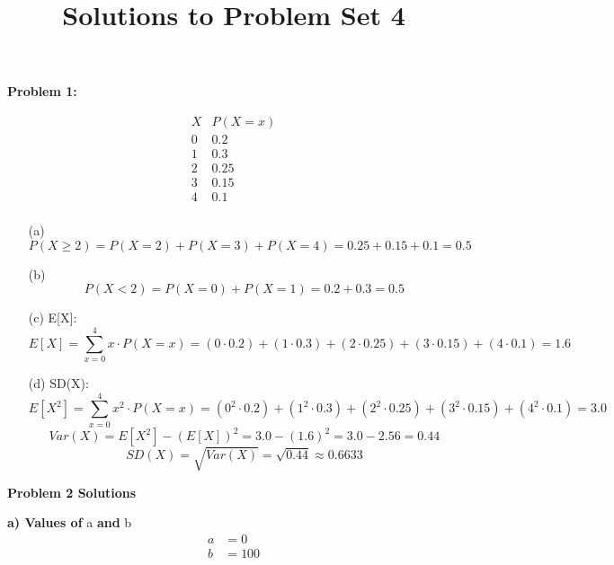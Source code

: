 \documentclass{article}
\title{Solutions to Problem Set 4}
\author{}
\date{}
\begin{document}
\maketitle

\textbf{Problem 1:}


\[
\begin{array}{c|c}
X & P(X = x) \\
\hline
0 & 0.2 \\
1 & 0.3 \\
2 & 0.25 \\
3 & 0.15 \\
4 & 0.1 \\
\end{array}
\]

\begin{itemize}
    \item[(a)] 
    \[
    P(X \geq 2) = P(X = 2) + P(X = 3) + P(X = 4) = 0.25 + 0.15 + 0.1 = 0.5
    \]

    \item[(b)] 
    \[
    P(X < 2) = P(X = 0) + P(X = 1) = 0.2 + 0.3 = 0.5
    \]

    \item[(c)]  E[X]:
    \[
    E[X] = \sum_{x=0}^{4} x \cdot P(X = x) = (0 \cdot 0.2) + (1 \cdot 0.3) + (2 \cdot 0.25) + (3 \cdot 0.15) + (4 \cdot 0.1) = 1.6
    \]

    \item[(d)]  SD(X):
    \[
    E[X^2] = \sum_{x=0}^{4} x^2 \cdot P(X = x) = (0^2 \cdot 0.2) + (1^2 \cdot 0.3) + (2^2 \cdot 0.25) + (3^2 \cdot 0.15) + (4^2 \cdot 0.1) = 3.0
    \]
    \[
    Var(X) = E[X^2] - (E[X])^2 = 3.0 - (1.6)^2 = 3.0 - 2.56 = 0.44
    \]
    \[
    SD(X) = \sqrt{Var(X)} = \sqrt{0.44} \approx 0.6633
    \]
\end{itemize}

\textbf{Problem 2 Solutions}

\textbf{a) Values of } a \textbf{ and } b
\begin{align*}
a &= 0 \\
b &= 100
\end{align*}
\end{document}
